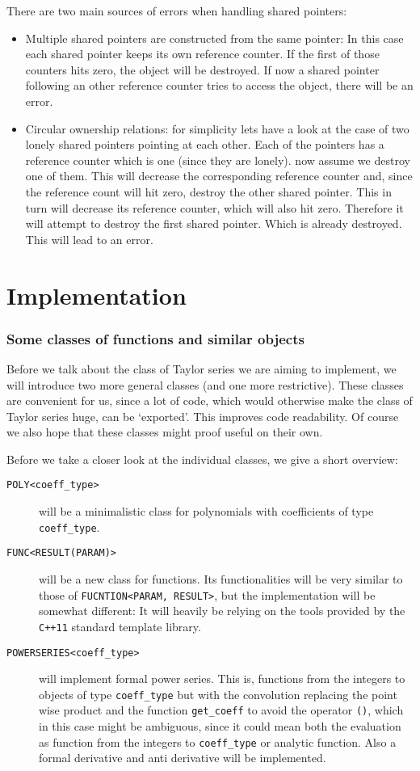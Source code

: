 \documentclass{article}
\newcommand{\ccOx}{\texttt{C++11}\xspace}
\newcommand{\ir}[1]{\texttt{#1}}
\newcommand{\code}[1]{\texttt{#1}}
\newcommand{\func}[1]{\texttt{#1}}
\begin{document}
There are two main sources of errors when handling shared pointers:
\begin{itemize}
\item Multiple shared pointers are constructed from the same pointer: In this case each shared pointer keeps its own reference counter. If the first of those counters hits zero, the object will be destroyed. If now a shared pointer following an other reference counter tries to access the object, there will be an error.
\item Circular ownership relations: for simplicity lets have a look at the case of two lonely shared pointers pointing at each other. Each of the pointers has a reference counter which is one (since they are lonely). now assume we destroy one of them. This will decrease the corresponding reference counter and, since the reference count will hit zero, destroy the other shared pointer. This in turn will decrease its reference counter, which will also hit zero. Therefore it will attempt to destroy the first shared pointer. Which is already destroyed. This will lead to an error.
\end{itemize}

\part{Implementation}

\section{Some classes of functions and similar objects}

Before we talk about the class of Taylor series we are aiming to implement, we will introduce two more general classes (and one more restrictive). These classes are convenient for us, since a lot of code, which would otherwise make the class of Taylor series huge, can be \lq exported\rq. This improves code readability. Of course we also hope that these classes might proof useful on their own.

Before we take a closer look at the individual classes, we give a short overview:
\begin{description}
\item[\func{POLY<coeff\_type>}] will be a minimalistic class for polynomials with coefficients of type \code{coeff\_type}.
\item[\func{FUNC<RESULT(PARAM)>}] will be a new class for functions. Its functionalities will be very similar to those of \ir{FUCNTION<PARAM, RESULT>}, but the implementation will be somewhat different: It will heavily be relying on the tools provided by the \ccOx standard template library.
\item[\func{POWERSERIES<coeff\_type>}] will implement formal power series. This is, functions from the integers to objects of type \code{coeff\_type} but with the convolution replacing the point wise product and the function \code{get\_coeff} to avoid the operator \code{()}, which in this case might be ambiguous, since it could mean both the evaluation as function from the integers to \code{coeff\_type} or analytic function. Also a formal derivative and anti derivative will be implemented.
\end{description}
\end{document}
